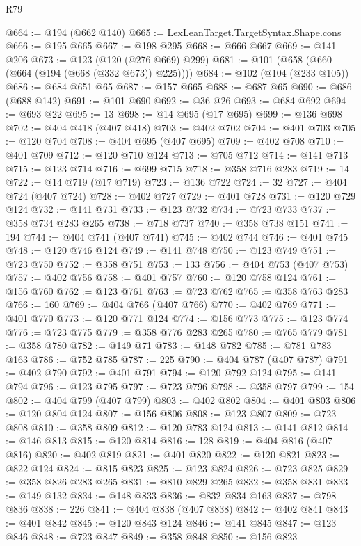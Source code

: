 \begin{lexlean}{R79}
\begin{coremodule}
@664 := @194 (@662 @140)
@665 := LexLeanTarget.TargetSyntax.Shape.cons
@666 := @195 @665
@667 := @198 @295
@668 := @666 @667
@669 := @141 @206
@673 := @123 (@120 (@276 @669) @299)
@681 := @101 (@658 (@660 (@664 (@194 (@668 (@332 @673)) @225))))
@684 := @102 (@104 (@233 @105))
@686 := @684 @651 @65
@687 := @157 @665
@688 := @687 @65
@690 := @686 (@688 @142)
@691 := @101 @690
@692 := @36 @26
@693 := @684 @692
@694 := @693 @22
@695 := 13
@698 := @14 @695 (@17 @695)
@699 := @136 @698
@702 := @404 @418 (@407 @418)
@703 := @402 @702
@704 := @401 @703
@705 := @120 @704
@708 := @404 @695 (@407 @695)
@709 := @402 @708
@710 := @401 @709
@712 := @120 @710 @124
@713 := @705 @712
@714 := @141 @713
@715 := @123 @714
@716 := @699 @715
@718 := @358 @716 @283
@719 := 14
@722 := @14 @719 (@17 @719)
@723 := @136 @722
@724 := 32
@727 := @404 @724 (@407 @724)
@728 := @402 @727
@729 := @401 @728
@731 := @120 @729 @124
@732 := @141 @731
@733 := @123 @732
@734 := @723 @733
@737 := @358 @734 @283 @265
@738 := @718 @737
@740 := @358 @738 @151
@741 := 194
@744 := @404 @741 (@407 @741)
@745 := @402 @744
@746 := @401 @745
@748 := @120 @746 @124
@749 := @141 @748
@750 := @123 @749
@751 := @723 @750
@752 := @358 @751
@753 := 133
@756 := @404 @753 (@407 @753)
@757 := @402 @756
@758 := @401 @757
@760 := @120 @758 @124
@761 := @156 @760
@762 := @123 @761
@763 := @723 @762
@765 := @358 @763 @283
@766 := 160
@769 := @404 @766 (@407 @766)
@770 := @402 @769
@771 := @401 @770
@773 := @120 @771 @124
@774 := @156 @773
@775 := @123 @774
@776 := @723 @775
@779 := @358 @776 @283 @265
@780 := @765 @779
@781 := @358 @780
@782 := @149 @71
@783 := @148 @782
@785 := @781 @783 @163
@786 := @752 @785
@787 := 225
@790 := @404 @787 (@407 @787)
@791 := @402 @790
@792 := @401 @791
@794 := @120 @792 @124
@795 := @141 @794
@796 := @123 @795
@797 := @723 @796
@798 := @358 @797
@799 := 154
@802 := @404 @799 (@407 @799)
@803 := @402 @802
@804 := @401 @803
@806 := @120 @804 @124
@807 := @156 @806
@808 := @123 @807
@809 := @723 @808
@810 := @358 @809
@812 := @120 @783 @124
@813 := @141 @812
@814 := @146 @813
@815 := @120 @814
@816 := 128
@819 := @404 @816 (@407 @816)
@820 := @402 @819
@821 := @401 @820
@822 := @120 @821
@823 := @822 @124
@824 := @815 @823
@825 := @123 @824
@826 := @723 @825
@829 := @358 @826 @283 @265
@831 := @810 @829 @265
@832 := @358 @831
@833 := @149 @132
@834 := @148 @833
@836 := @832 @834 @163
@837 := @798 @836
@838 := 226
@841 := @404 @838 (@407 @838)
@842 := @402 @841
@843 := @401 @842
@845 := @120 @843 @124
@846 := @141 @845
@847 := @123 @846
@848 := @723 @847
@849 := @358 @848
@850 := @156 @823

\end{coremodule}
\end{lexlean}
